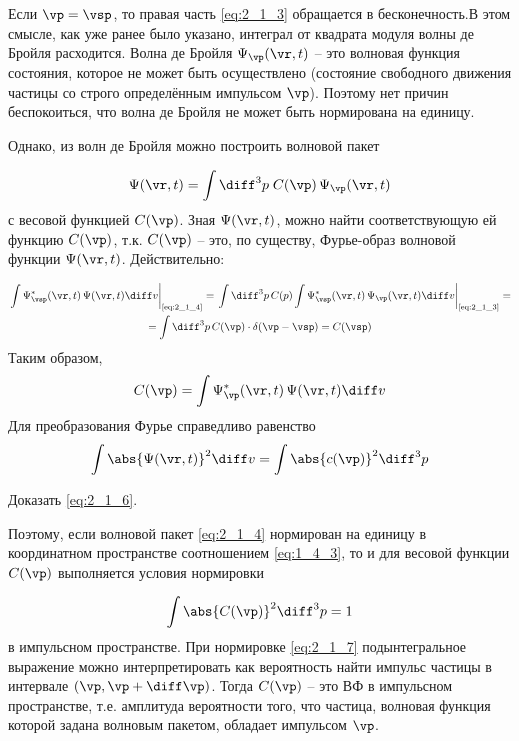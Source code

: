 Если $\vp=\vsp$, то правая часть \eqref{eq:2_1_3} обращается в бесконечность.В этом смысле, как уже ранее было указано, интеграл от квадрата модуля волны де Бройля расходится. Волна де Бройля $\Psi_{\vp}(\vr, t)$ -- это волновая функция состояния, которое не может быть осуществлено (состояние свободного движения частицы со строго определённым импульсом $\vp$). Поэтому нет причин беспокоиться, что волна де Бройля не может быть нормирована на единицу.

Однако, из волн де Бройля можно построить волновой пакет

\begin{equation}
\label{eq:2_1_4}
\Psi(\vr,t) = \int \diff^3 p \; C(\vp) \, \Psi_{\vp}(\vr,t)
\end{equation}%
%
с весовой функцией $C(\vp)$. Зная $\Psi(\vr,t)$, можно найти соответствующую ей функцию $C(\vp)$, т.к. $C(\vp)$ -- это, по существу, Фурье-образ волновой функции $\Psi(\vr,t)$. Действительно:
%

$$
\begin{gathered}
\left. \int \Psi^*_{\vsp}(\vr,t) \, \Psi(\vr,t)\diff v \right|_{\text{\eqref{eq:2_1_4}}} =
  \left. \int \diff ^3p \, C(p) \int \Psi^*_{\vsp}(\vr,t) \, \Psi_{\vp}(\vr,t)\diff v \right|_{\text{\eqref{eq:2_1_3}}} =\\
  = \int \diff^3p \, C(\vp) \cdot \delta (\vp - \vsp) = C(\vsp)
\end{gathered}
$$%
%
Таким образом,
\begin{equation}
\label{eq:2_1_5}
C(\vp) = \int\Psi^*_{\vp}(\vr,t) \, \Psi(\vr,t)\diff v
\end{equation}%
%
Для преобразования Фурье справедливо равенство
\begin{equation}
\label{eq:2_1_6}
\int \abs{ \Psi(\vr,t) }^2\diff v = \int \abs{c(\vp)}^2 \diff ^3 p
\end{equation}

\begin{excr}
Доказать \eqref{eq:2_1_6}.
\end{excr}%

\noindent
Поэтому, если волновой пакет \eqref{eq:2_1_4} нормирован на единицу в координатном пространстве соотношением \eqref{eq:1_4_3}, то и для весовой функции $C(\vp)$ выполняется условия нормировки

\begin{equation}
\label{eq:2_1_7}
\int \abs{C(\vp)}^2\diff^3 p = 1
\end{equation}%
%
в импульсном пространстве. При нормировке \eqref{eq:2_1_7} подынтегральное выражение можно интерпретировать как вероятность найти импульс частицы в интервале $(\vp,\vp+\diff\vp)$. Тогда $C(\vp)$ -- это {ВФ в импульсном пространстве}, т.е. амплитуда вероятности того, что частица, волновая функция которой задана волновым пакетом, обладает импульсом $\vp$.

